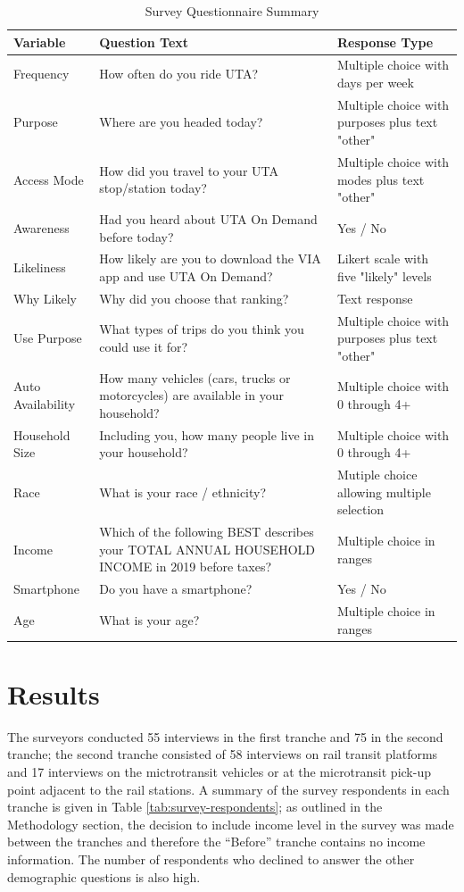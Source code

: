\documentclass[smartcities,article,submit,moreauthors,pdftex]{mdpi}
\begin{document}
\begin{table}

\caption{\label{tab:survey-questions}Survey Questionnaire Summary}
\centering
\begin{tabular}[t]{lp{}p{}}
\toprule
Variable & Question Text & Response Type\\
\midrule
Frequency & How often do you ride UTA? & Multiple choice with days per week\\
Purpose & Where are you headed today? & Multiple choice with purposes plus text "other"\\
Access Mode & How did you travel to your UTA stop/station today? & Multiple choice with modes plus text "other"\\
Awareness & Had you heard about UTA On Demand before today? & Yes / No\\
Likeliness & How likely are you to download the VIA app and use UTA On Demand? & Likert scale with five "likely" levels\\
\addlinespace
Why Likely & Why did you choose that ranking? & Text response\\
Use Purpose & What types of trips do you think you could use it for? & Multiple choice with purposes plus text "other"\\
Auto Availability & How many vehicles (cars, trucks or motorcycles) are available in your household? & Multiple choice with 0 through 4+\\
Household Size & Including you, how many people live in your household? & Multiple choice with 0 through 4+\\
Race & What is your race / ethnicity? & Mutiple choice allowing multiple selection\\
\addlinespace
Income & Which of the following BEST describes your TOTAL ANNUAL HOUSEHOLD INCOME in 2019 before taxes? & Multiple choice in ranges\\
Smartphone & Do you have a smartphone? & Yes / No\\
Age & What is your age? & Multiple choice in ranges\\
\bottomrule
\end{tabular}
\end{table}

\hypertarget{results}{%
\section{Results}\label{results}}

The surveyors conducted 55 interviews in the first tranche and 75 in the second
tranche; the second tranche consisted of 58 interviews on rail transit platforms
and 17 interviews on the mictrotransit vehicles or at the microtransit pick-up
point adjacent to the rail stations. A summary of the survey respondents in each
tranche is given in Table \ref{tab:survey-respondents}; as outlined in the
Methodology section, the decision to include income level in the survey was made
between the tranches and therefore the ``Before'' tranche contains no income
information. The number of respondents who declined to answer the other
demographic questions is also high.
\end{document}
